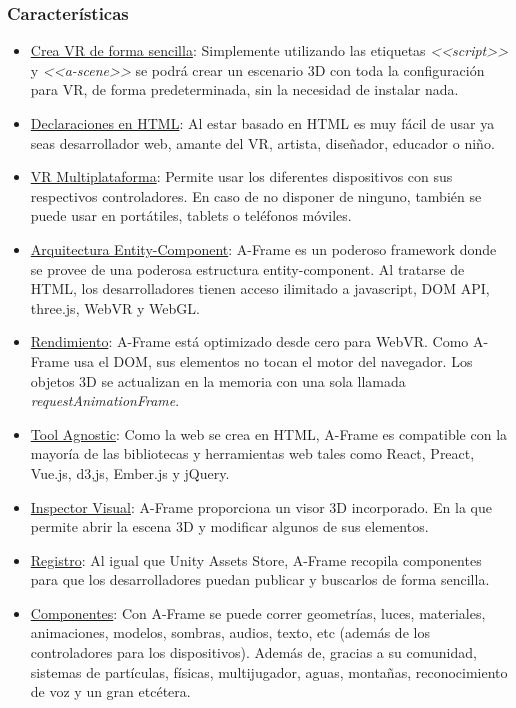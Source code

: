 \documentclass[a4paper, 12pt]{book}
\begin{document}
\subsubsection{Características}
\begin{itemize}
\item \underline{Crea VR de forma sencilla}: Simplemente utilizando las etiquetas \textit{<<script>>} y \textit{<<a-scene>>} se podrá crear un escenario 3D con toda la configuración para VR, de forma predeterminada, sin la necesidad de instalar nada.

\item \underline{Declaraciones en HTML}: Al estar basado en HTML es muy f\'acil de usar ya seas desarrollador web, amante del VR, artista, diseñador, educador o niño.
\item \underline{VR Multiplataforma}: Permite usar los diferentes dispositivos con sus respectivos controladores. En caso de no disponer de ninguno, también se puede usar en portátiles, tablets o teléfonos  móviles.
\item \underline{Arquitectura Entity-Component}: A-Frame es un poderoso framework donde se provee de una poderosa estructura entity-component. Al tratarse de HTML, los desarrolladores tienen acceso ilimitado a javascript, DOM API, three.js, WebVR y WebGL.
\item \underline{Rendimiento}: A-Frame está optimizado desde cero para WebVR. Como A-Frame usa el DOM, sus elementos no tocan el motor del navegador. Los objetos 3D se actualizan en la memoria con una sola llamada \textit{requestAnimationFrame}.
\item \underline{Tool Agnostic}: Como la web se crea en HTML, A-Frame es compatible con la mayoría de las bibliotecas y herramientas web tales como React, Preact, Vue.js, d3,js, Ember.js y jQuery.
\item \underline{Inspector Visual}: A-Frame proporciona un visor 3D incorporado. En la que permite abrir la escena 3D y modificar algunos de sus elementos.
\item \underline{Registro}: Al igual que Unity Assets Store, A-Frame recopila componentes para que los desarrolladores puedan publicar y buscarlos de forma sencilla.
\item \underline{Componentes}: Con A-Frame se puede correr geometrías, luces, materiales, animaciones, modelos, sombras, audios, texto, etc (además de los controladores para los dispositivos). Además de, gracias a su comunidad, sistemas de partículas, físicas, multijugador, aguas, montañas, reconocimiento de voz y un gran etcétera.
\end{itemize}
\end{document}

